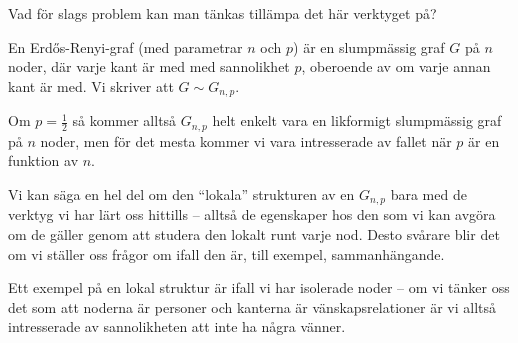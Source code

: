 \documentclass[nobib]{tufte-handout}
\begin{document}
Vad för slags problem kan man tänkas tillämpa det här verktyget på?

\begin{definition}
    En Erd\H{o}s-Renyi-graf (med parametrar $n$ och $p$) är en slumpmässig graf $G$ på $n$ noder, där varje kant är med med sannolikhet $p$, oberoende av om varje annan kant är med. Vi skriver att $G \sim G_{n,p}$.

    Om $p = \frac{1}{2}$ så kommer alltså $G_{n,p}$ helt enkelt vara en likformigt slumpmässig graf på $n$ noder, men för det mesta kommer vi vara intresserade av fallet när $p$ är en funktion av $n$.
\end{definition}

Vi kan säga en hel del om den ``lokala'' strukturen av en $G_{n,p}$ bara med de verktyg vi har lärt oss hittills -- alltså de egenskaper hos den som vi kan avgöra om de gäller genom att studera den lokalt runt varje nod. Desto svårare blir det om vi ställer oss frågor om ifall den är, till exempel, sammanhängande.

Ett exempel på en lokal struktur är ifall vi har isolerade noder -- om vi tänker oss det som att noderna är personer och kanterna är vänskapsrelationer är vi alltså intresserade av sannolikheten att inte ha några vänner.
\end{document}
